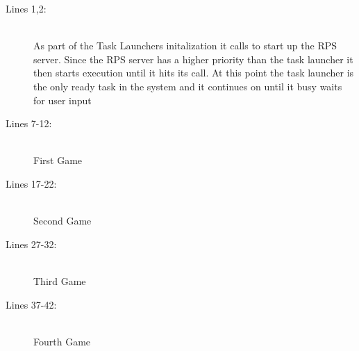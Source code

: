 \documentclass[pdftex,10pt,a4paper]{article}
\begin{document}
\begin{description}
\item[Lines 1,2:] \hfill \\
As part of the Task Launchers initalization it calls  to start
up the RPS server. Since the RPS server has a higher priority than the task
launcher it then starts execution until it hits its  call. At this
point the task launcher is the only ready task in the system and it continues on
until it busy waits for user input

\item[Lines 7-12:] \hfill \\
First Game

\item[Lines 17-22:] \hfill \\
Second Game

\item[Lines 27-32:] \hfill \\
Third Game

\item[Lines 37-42:] \hfill \\
Fourth Game
\end{description}
\end{document}
